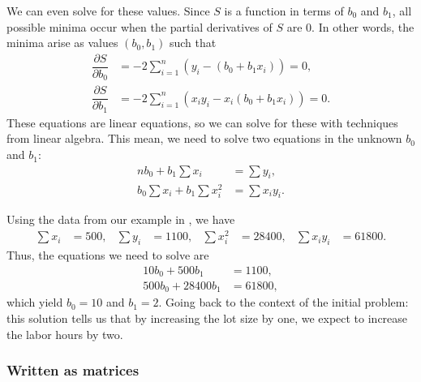\documentclass[a4paper, 12pt]{article}
\numberwithin{equation}{section}
\numberwithin{figure}{section}
\theoremstyle{definition}
\begin{document}
We can even solve for these values. Since $S$ is a function in terms of $b_0$
and $b_1$, all possible minima occur when the partial derivatives of $S$ are
$0$. In other words, the minima arise as values $(b_0,b_1)$ such that 
\begin{align*}
	\dfrac{\partial S}{\partial b_0} &= -2\sum_{i=1}^n \left(y_i - (b_0 + b_1x_i)\right) = 0, \\
	\dfrac{\partial S}{\partial b_1} &= -2\sum_{i=1}^n \left(x_iy_i - x_i(b_0 + b_1x_i)\right) = 0.
\end{align*}
These equations are linear equations, so we can solve for these with techniques
from linear algebra. This mean, we need to solve two equations in the unknown
$b_0$ and $b_1$:
\begin{equation}\label{eqn:least-squares-line}
	\begin{split}
		nb_0 + b_1\sum x_i &= \sum y_i, \\
		b_0 \sum x_i + b_1 \sum x_i^2 &= \sum x_iy_i. 
	\end{split}
\end{equation}

Using the data from our example in , we have 
\begin{align*}
	\sum x_i &= 500, & 
	\sum y_i &= 1100, & 
	\sum x_i^2 &= 28400, & 
	\sum x_iy_i &= 61800. 
\end{align*}
Thus, the equations we need to solve are 
\begin{align*}
	10b_0 + 500b_1 &= 1100, \\
	500b_0 + 28400b_1 &= 61800,
\end{align*}
which yield $b_0=10$ and $b_1 = 2$. Going back to the context of the initial
problem: this solution tells us that by increasing the lot size by one, we
expect to increase the labor hours by two. 

\subsubsection{Written as matrices}
\end{document}
